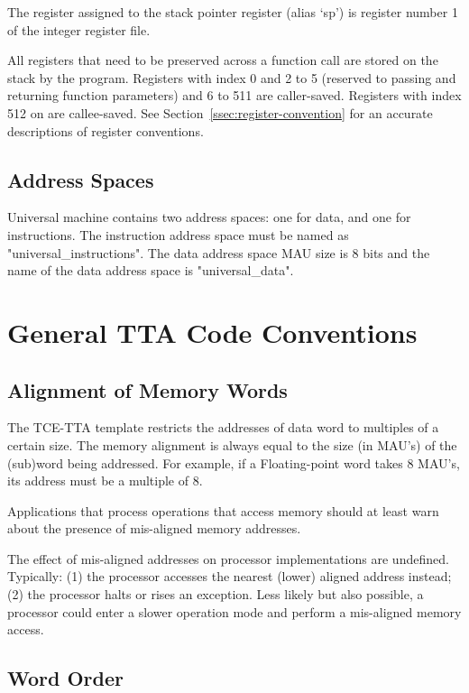 \documentclass[twoside]{tce}
\begin{document}
The register assigned to the stack pointer register (alias `sp') is register 
number 1 of the integer register file.

All registers that need to be preserved across a function call are stored on
the stack by the program.  Registers with index 0 and 2 to 5 
(reserved to passing and returning function parameters) and 6 to 511 are 
caller-saved.  Registers with index 512 on are callee-saved.  See
Section~\ref{ssec:register-convention} for an accurate descriptions of
register conventions.

\subsection{Address Spaces}
\label{ssec:address-spaces-of-umach}

Universal machine contains two address spaces: one for data, and one 
for instructions. The instruction address space must be named as 
"universal\_instructions". The data address space MAU size is 8 bits
and the name of the data address space is "universal\_data".

\section{General TTA Code Conventions}
\label{sec:code-conventions}

\subsection{Alignment of Memory Words}
\label{ssec:align-conventions}

The TCE-TTA template restricts the addresses of data word to multiples of a
certain size.  The memory alignment is always equal to the size (in MAU's)
of the (sub)word being addressed.  For example, if a Floating-point word
takes 8 MAU's, its address must be a multiple of 8.

Applications that process operations that access memory should at least warn
about the presence of mis-aligned memory addresses.

The effect of mis-aligned addresses on processor implementations are
undefined. Typically: (1) the processor accesses the nearest (lower) aligned
address instead; (2) the processor halts or rises an exception. Less likely
but also possible, a processor could enter a slower operation mode and
perform a mis-aligned memory access.

\subsection{Word Order}
\label{ssec:word-order}
\end{document}
